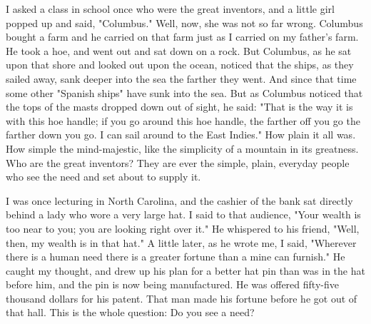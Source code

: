 \documentclass[10pt]{article}
\begin{document}
I asked a class in school once who were the great inventors, and a little girl popped up and said, "Columbus." Well, now, she was not so far wrong. Columbus bought a farm and he carried on that farm just as I carried on my father's farm. He took a hoe, and went out and sat down on a rock. But Columbus, as he sat upon that shore and looked out upon the ocean, noticed that the ships, as they sailed away, sank deeper into the sea the farther they went. And since that time some other "Spanish ships" have sunk into the sea. But as Columbus noticed that the tops of the masts dropped down out of sight, he said: "That is the way it is with this hoe handle; if you go around this hoe handle, the farther off you go the farther down you go. I can sail around to the East Indies." How plain it all was. How simple the mind-majestic, like the simplicity of a mountain in its greatness. Who are the great inventors? They are ever the simple, plain, everyday people who see the need and set about to supply it.

I was once lecturing in North Carolina, and the cashier of the bank sat directly behind a lady who wore a very large hat. I said to that audience, "Your wealth is too near to you; you are looking right over it." He whispered to his friend, "Well, then, my wealth is in that hat." A little later, as he wrote me, I said, "Wherever there is a human need there is a greater fortune than a mine can furnish." He caught my thought, and drew up his plan for a better hat pin than was in the hat before him, and the pin is now being manufactured. He was offered fifty-five thousand dollars for his patent. That man made his fortune before he got out of that hall. This is the whole question: Do you see a need?
\end{document}
